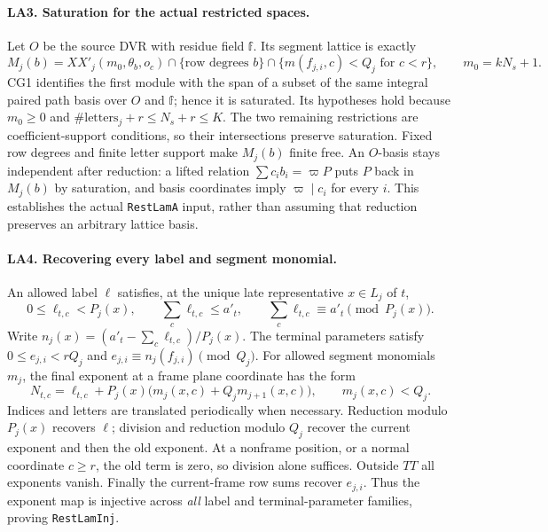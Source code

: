 \documentclass[11pt,a4paper]{article}
\numberwithin{equation}{section}
\theoremstyle{remark}\newtheorem{remark}[theorem]{Remark}
\begin{document}
\paragraph{LA3. Saturation for the actual restricted spaces.}
Let $O$ be the source DVR with residue field $\mathbb f$.
Its segment lattice is exactly
\[
 M_j(b)=XX'_j(m_0,\theta_b,o_c)
 \cap\{\text{row degrees }b\}
 \cap\{m(f_{j,i},c)<Q_j\text{ for }c<r\},
 \qquad m_0=kN_s+1.
\]
CG1 identifies the first module with the span of a subset of the same integral paired path basis over $O$ and $\mathbb f$; hence it is saturated.
Its hypotheses hold because $m_0\ge0$ and
$\#\mathrm{letters}_j+r\le N_s+r\le K$.
The two remaining restrictions are coefficient-support conditions, so their intersections preserve saturation.
Fixed row degrees and finite letter support make $M_j(b)$ finite free.
An $O$-basis stays independent after reduction: a lifted relation
$\sum c_i b_i=\varpi P$ puts $P$ back in $M_j(b)$ by saturation, and basis coordinates imply $\varpi\mid c_i$ for every $i$.
This establishes the actual \texttt{RestLamA} input, rather than assuming that reduction preserves an arbitrary lattice basis.

\paragraph{LA4. Recovering every label and segment monomial.}
An allowed label $\ell$ satisfies, at the unique late representative $x\in L_j$ of $t$,
\[
 0\le\ell_{t,c}<P_j(x),\qquad
 \sum_c\ell_{t,c}\le a'_t,\qquad
 \sum_c\ell_{t,c}\equiv a'_t\pmod{P_j(x)}.
\]
Write $n_j(x)=(a'_t-\sum_c\ell_{t,c})/P_j(x)$.
The terminal parameters satisfy $0\le e_{j,i}<rQ_j$ and
$e_{j,i}\equiv n_j(f_{j,i})\pmod{Q_j}$.
For allowed segment monomials $m_j$, the final exponent at a frame plane coordinate has the form
\[
 N_{t,c}=\ell_{t,c}+P_j(x)\bigl(m_j(x,c)+Q_jm_{j+1}(x,c)\bigr),
 \qquad m_j(x,c)<Q_j. \tag{LA.3}
\]
Indices and letters are translated periodically when necessary.
Reduction modulo $P_j(x)$ recovers $\ell$; division and reduction modulo $Q_j$ recover the current exponent and then the old exponent.
At a nonframe position, or a normal coordinate $c\ge r$, the old term is zero, so division alone suffices.
Outside $TT$ all exponents vanish.
Finally the current-frame row sums recover $e_{j,i}$.
Thus the exponent map is injective across \emph{all} label and terminal-parameter families, proving \texttt{RestLamInj}.
\end{document}
